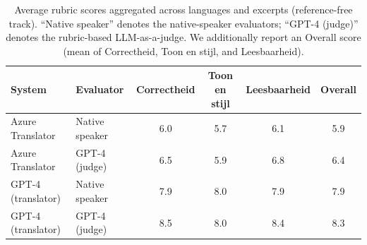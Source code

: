 \begin{table}[htbp]
\centering
\scriptsize
\renewcommand{\arraystretch}{1.15}
\setlength{\tabcolsep}{6pt}
\caption{Average rubric scores aggregated across languages and excerpts (reference-free track). ``Native speaker'' denotes the native-speaker evaluators; ``GPT-4 (judge)'' denotes the rubric-based LLM-as-a-judge. We additionally report an Overall score (mean of Correctheid, Toon en stijl, and Leesbaarheid).}
\label{tab:ref-free-avg-scores}
\begin{tabular}{@{}l l c c c c@{}}
\toprule
System & Evaluator & Correctheid & Toon en stijl & Leesbaarheid & Overall \\
\midrule
Azure Translator & Native speaker & 6.0 & 5.7 & 6.1 & 5.9 \\
Azure Translator & GPT-4 (judge) & 6.5 & 5.9 & 6.8 & 6.4 \\
GPT-4 (translator) & Native speaker & 7.9 & 8.0 & 7.9 & 7.9 \\
GPT-4 (translator) & GPT-4 (judge) & 8.5 & 8.0 & 8.4 & 8.3 \\
\bottomrule
\end{tabular}
\end{table}
